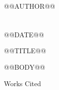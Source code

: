 \documentclass[12pt,letterpaper]{article}
\begin{document}
\noindent @@AUTHOR@@\\
\\
\\
@@DATE@@

\begin{center}@@TITLE@@\end{center}
@@BODY@@

\newpage
\begin{center}Works Cited\end{center}
\noindent{}
\end{document}
